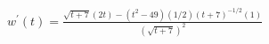$ \displaystyle w^{\prime}(t) = \frac{\sqrt{t + 7}(2t) - (t^2 - 49)(1/2)(t+7)^{-1/2}(1)}{(\sqrt{t + 7})^2} $